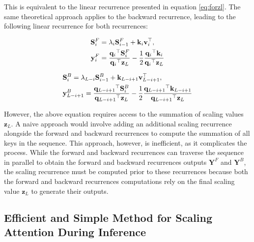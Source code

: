 This is equivalent to the linear recurrence presented in equation \eqref{eq:forzl}. The same theoretical approach applies to the backward recurrence, leading to the following linear recurrence for both recurrences:  


\begin{minipage}[t]{.35\textwidth}
\begin{subequations}
\label{eq:rec11}
\begin{align}
    \mathbf{S}^{F}_i &= \textcolor{black}{{\lambda}_i} \mathbf{S}^F_{i-1} + \mathbf{k}_i \mathbf{v}_i^{\top}, \\
    \mathbf{y}^{F}_i &= \frac{{{\mathbf{q}_i}}^{\top} \mathbf{S}^F_i}{{{\mathbf{q}_i}}^{\top} \mathbf{z}_L}  - \frac{1}{2}\frac{{{\mathbf{q}_{i}}}^{\top} \mathbf{k}_{i}}{{{\mathbf{q}_{i}}}^{\top} \mathbf{z}_L}
\end{align}
\end{subequations}
\end{minipage}
\begin{minipage}[t]{.64\textwidth}
\begin{subequations}
\label{eq:rec12}
    \begin{align}
    &\mathbf{S}^{B}_i= \textcolor{black}{{\lambda}_{L-i}} \mathbf{S}^B_{i-1} + \mathbf{k}_{L-i+1} \mathbf{v}_{L-i+1}^{\top}, \\
    &\mathbf{y}^{B}_{L-i+1} = \frac{{{\mathbf{q}_{L-i+1}}}^{\top} \mathbf{S}^B_i}{{{\mathbf{q}_{L-i+1}}}^{\top} \mathbf{z}_L} - \frac{1}{2}\frac{{{\mathbf{q}_{L-i+1}}}^{\top} \mathbf{k}_{L-i+1}}{{{\mathbf{q}_{L-i+1}}}^{\top} \mathbf{z}_L}
\end{align}
\end{subequations}
\end{minipage}%

However, the above equation requires access to the summation of scaling values \(\mathbf{z}_L\). A naive approach would involve adding an additional scaling recurrence alongside the forward and backward recurrences to compute the summation of all keys in the sequence. This approach, however, is inefficient, as it complicates the process. While the forward and backward recurrences can traverse the sequence in parallel to obtain the forward and backward recurrences outputs \(\mathbf{Y}^F\) and \(\mathbf{Y}^B\), the scaling recurrence must be computed prior to these recurrences because both the forward and backward recurrences computations rely on the final scaling value \(\mathbf{z}_L\) to generate their outputs.

\subsection{Efficient and Simple Method for Scaling Attention During Inference}

